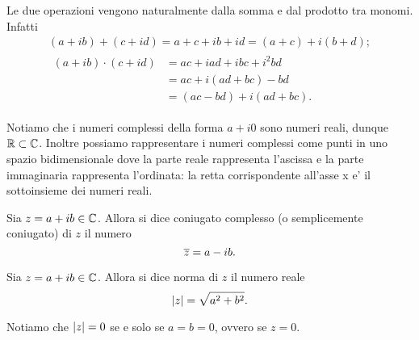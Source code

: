 \begin{remark}
    Le due operazioni vengono naturalmente dalla somma e dal prodotto tra monomi. Infatti \begin{gather*}
        (a + ib) + (c + id) = a + c + ib + id = (a + c) + i(b + d);\\
        \begin{alignedat}{1}
            (a + ib) \cdot (c + id) &= ac + iad + ibc + i^2bd \\
            &= ac + i(ad + bc) -bd \\
            &= (ac - bd) + i(ad + bc).
        \end{alignedat}
    \end{gather*}
\end{remark}

Notiamo che i numeri complessi della forma $a + i0$ sono numeri reali, dunque $\mathbb{R} \subset \mathbb{C}$. Inoltre possiamo rappresentare i numeri complessi come punti in uno spazio bidimensionale dove la parte reale rappresenta l'ascissa e la parte immaginaria rappresenta l'ordinata: la retta corrispondente all'asse x e' il sottoinsieme dei numeri reali.

\begin{definition}
    Sia $z = a+ib \in \mathbb{C}$. Allora si dice coniugato complesso (o semplicemente coniugato) di $z$ il numero \[
        \overline{z} = a - ib.    
    \]
\end{definition}

\begin{definition}
    Sia $z = a + ib \in \mathbb{C}$. Allora si dice norma di $z$ il numero reale \[
        \left|z\right| = \sqrt{a^2 + b^2}.    
    \]
\end{definition}

Notiamo che $\left|z\right| = 0$ se e solo se $a = b = 0$, ovvero se $z = 0$.


